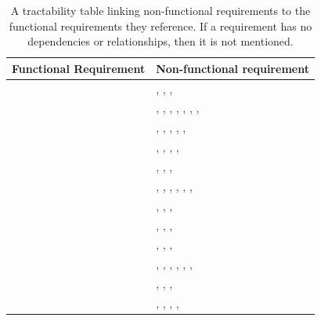 \documentclass{article}
\begin{document}
\begin{table}[!h]
\begin{center}
\caption {A tractability table linking non-functional requirements to the functional requirements they reference. If a requirement has no dependencies or relationships, then it is not mentioned. }
\label{TRACE_FR_NFR}
\begin{tabular}{ | m{7cm} | m{7cm} | }
\hline
Functional Requirement & Non-functional requirement  \\
\hline
\nameref{STA_000} & \nameref{PERF_007}, \nameref{SAFE_001}, \nameref{SAFE_003}, \nameref{USE_003}  \\
\hline
\nameref{STA_001} & \nameref{PERF_002}, \nameref{PERF_004}, \nameref{PERF_005}, \nameref{PERF_006}, \nameref{PERF_007}, \nameref{SAFE_001}, \nameref{SAFE_003}, \nameref{USE_003}  \\
\hline
\nameref{STA_003} & \nameref{PERF_001}, \nameref{PERF_004}, \nameref{PERF_007}, \nameref{SAFE_001}, \nameref{SAFE_003}, \nameref{USE_003}  \\
\hline
\nameref{STA_004} & \nameref{PERF_004}, \nameref{PERF_007}, \nameref{SAFE_001}, \nameref{SAFE_003}, \nameref{USE_003}  \\
\hline
\nameref{STA_005} & \nameref{PERF_004}, \nameref{PERF_007}, \nameref{SAFE_001}, \nameref{SAFE_003}  \\
\hline
\nameref{STA_006} & \nameref{PERF_002}, \nameref{PERF_004}, \nameref{PERF_006}, \nameref{PERF_007}, \nameref{SAFE_001}, \nameref{SAFE_003}, \nameref{USE_003}  \\
\hline
\nameref{STA_008} & \nameref{PERF_007}, \nameref{SAFE_001}, \nameref{SAFE_003}, \nameref{USE_003}  \\
\hline
\nameref{STA_009} & \nameref{PERF_007}, \nameref{SAFE_001}, \nameref{SAFE_003}, \nameref{USE_003}  \\
\hline
\hline
\nameref{STA_010} & \nameref{PERF_007}, \nameref{SAFE_001}, \nameref{SAFE_003}, \nameref{USE_003}  \\
\hline
\nameref{STA_011} & \nameref{PERF_003}, \nameref{PERF_004}, \nameref{PERF_006}, \nameref{PERF_007}, \nameref{SAFE_001}, \nameref{SAFE_003}, \nameref{USE_003}  \\
\hline
\nameref{STA_012} & \nameref{PERF_007}, \nameref{SAFE_001}, \nameref{SAFE_003}, \nameref{USE_003}  \\
\hline
\nameref{STA_013} & \nameref{PERF_002}, \nameref{PERF_007}, \nameref{SAFE_001}, \nameref{SAFE_003}, \nameref{USE_003}  \\
\hline

\end{tabular}
\end{center}
\end{table}
\end{document}
